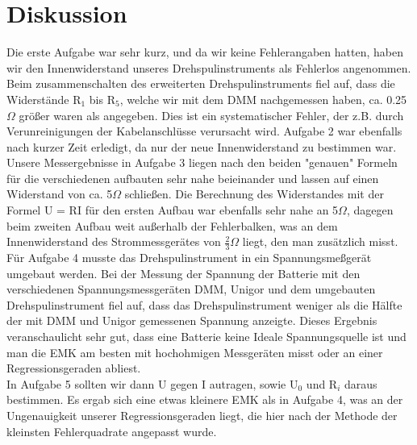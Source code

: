 \documentclass[12pt]{scrartcl}
\begin{document}
\newpage

\section{Diskussion}

Die erste Aufgabe war sehr kurz, und da wir keine Fehlerangaben hatten, haben wir den Innenwiderstand unseres Drehspulinstruments als Fehlerlos angenommen.\\
Beim zusammenschalten des erweiterten Drehspulinstruments fiel auf, dass die Widerstände R$_1$ bis R$_5$, welche wir mit dem DMM nachgemessen haben, ca. 0.25$\Omega$ größer waren als angegeben. Dies ist ein systematischer Fehler, der z.B. durch Verunreinigungen der Kabelanschlüsse verursacht wird. Aufgabe 2 war ebenfalls nach kurzer Zeit erledigt, da nur der neue Innenwiderstand zu bestimmen war.\\
Unsere Messergebnisse in Aufgabe 3 liegen nach den beiden "genauen" Formeln für die verschiedenen aufbauten sehr nahe beieinander und lassen auf einen Widerstand von ca. 5$\Omega$ schließen. Die Berechnung des Widerstandes mit der Formel U = RI für den ersten Aufbau war ebenfalls sehr nahe an 5$\Omega$, dagegen beim zweiten Aufbau weit außerhalb der Fehlerbalken, was an dem Innenwiderstand des Strommessgerätes von $\frac{2}{3}\Omega$ liegt, den man zusätzlich misst.\\
Für Aufgabe 4 musste das Drehspulinstrument in ein Spannungsmeßgerät umgebaut werden. Bei der Messung der Spannung der Batterie mit den verschiedenen Spannungsmessgeräten DMM, Unigor und dem umgebauten Drehspulinstrument fiel auf, dass das Drehspulinstrument weniger als die Hälfte der mit DMM und Unigor gemessenen Spannung anzeigte. Dieses Ergebnis veranschaulicht sehr gut, dass eine Batterie keine Ideale Spannungsquelle ist und man die EMK am besten mit hochohmigen Messgeräten misst oder an einer Regressionsgeraden abliest.\\
In Aufgabe 5 sollten wir dann U gegen I autragen, sowie U$_0$ und R$_i$ daraus bestimmen. Es ergab sich eine etwas kleinere EMK als in Aufgabe 4, was an der Ungenauigkeit unserer Regressionsgeraden liegt, die hier nach der Methode der kleinsten Fehlerquadrate angepasst wurde.  


\end{document}

